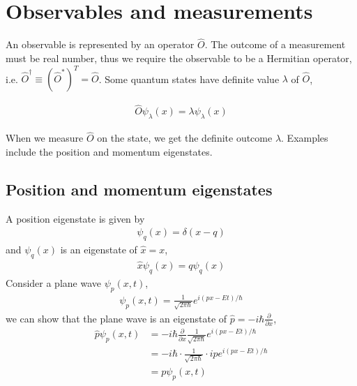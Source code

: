 \documentclass[12pt]{book} %
\numberwithin{equation}{chapter}
\def\d{\delta}
\def\p{\partial}
\begin{document}
\section{Observables and measurements}
An observable is represented by an operator $\hat{O}$. The outcome of a measurement must be real number, thus we require the observable to be a Hermitian operator, i.e. $\hat{O}^\dag\equiv{(\hat{O}^\ast)}^{T}=\hat{O}$.\bigskip\newline
Some quantum states have definite value $\lambda$ of $\hat{O}$,
\begin{eqnbox}
\begin{align}
\hat{O}\psi_{\lambda}(x)=\lambda\psi_{\lambda}(x)
\end{align}
\end{eqnbox}
When we measure $\hat{O}$ on the state, we get the definite outcome $\lambda$. Examples include the position and momentum eigenstates. 

\subsection*{Position and momentum eigenstates}
A position eigenstate is given by
\begin{align}
\psi_{q}(x)=\d (x-q)\nonumber
\end{align}
and $\psi_{q}(x)$ is an eigenstate of $\hat{x}=x$,
\begin{align}
\hat{x}\psi_{q}(x)=q\psi_{q}(x)\nonumber
\end{align}
Consider a plane wave $\psi_{p}(x, t)$,
\begin{align}
\psi_{p}(x, t)=\frac{1}{\sqrt{2\pi\hbar}}e^{i\left(px-Et\right)/\hbar}\nonumber
\end{align}
we can show that the plane wave is an eigenstate of $\hat{p}=-i\hbar\frac{\p}{\p x}$,
\begin{align}
\hat{p} \psi_{p}(x, t)&=-i\hbar\frac{\p}{\p x}\frac{1}{\sqrt{2\pi\hbar}}e^{i\left(px-Et\right)/ \hbar}\nonumber\\
&=-i\hbar\cdot\frac{1}{\sqrt{2\pi\hbar}}\cdot ipe^{i\left(px-Et\right)/\hbar}\nonumber\\
&=p\psi_{p}(x, t)\nonumber
\end{align}
\end{document}
